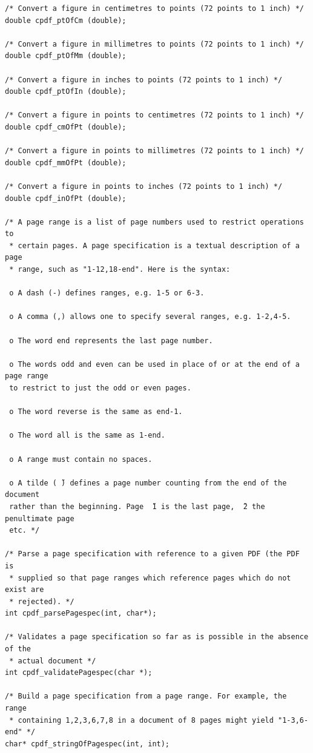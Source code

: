 \documentclass[a4paper]{memoir}
\begin{document}
\begin{small}
\begin{lstlisting}
/* Convert a figure in centimetres to points (72 points to 1 inch) */
double cpdf_ptOfCm (double);

/* Convert a figure in millimetres to points (72 points to 1 inch) */
double cpdf_ptOfMm (double);

/* Convert a figure in inches to points (72 points to 1 inch) */
double cpdf_ptOfIn (double);

/* Convert a figure in points to centimetres (72 points to 1 inch) */
double cpdf_cmOfPt (double);

/* Convert a figure in points to millimetres (72 points to 1 inch) */
double cpdf_mmOfPt (double);

/* Convert a figure in points to inches (72 points to 1 inch) */
double cpdf_inOfPt (double);

/* A page range is a list of page numbers used to restrict operations to
 * certain pages. A page specification is a textual description of a page
 * range, such as "1-12,18-end". Here is the syntax:

 o A dash (-) defines ranges, e.g. 1-5 or 6-3.

 o A comma (,) allows one to specify several ranges, e.g. 1-2,4-5.

 o The word end represents the last page number.

 o The words odd and even can be used in place of or at the end of a page range
 to restrict to just the odd or even pages.

 o The word reverse is the same as end-1.

 o The word all is the same as 1-end.

 o A range must contain no spaces.

 o A tilde ( ̃) defines a page number counting from the end of the document
 rather than the beginning. Page  ̃1 is the last page,  ̃2 the penultimate page
 etc. */

/* Parse a page specification with reference to a given PDF (the PDF is
 * supplied so that page ranges which reference pages which do not exist are
 * rejected). */
int cpdf_parsePagespec(int, char*);

/* Validates a page specification so far as is possible in the absence of the
 * actual document */
int cpdf_validatePagespec(char *);

/* Build a page specification from a page range. For example, the range
 * containing 1,2,3,6,7,8 in a document of 8 pages might yield "1-3,6-end" */
char* cpdf_stringOfPagespec(int, int);


\end{lstlisting}
\end{small}
\end{document}
